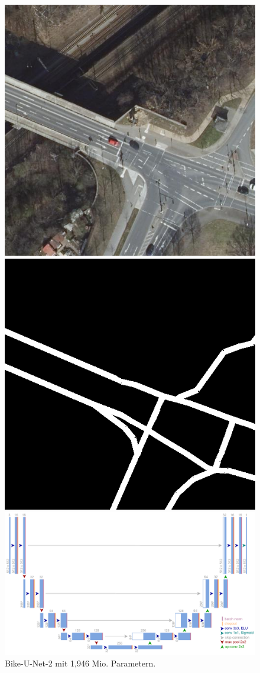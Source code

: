 \begin{figure}[h]
	\begin{minipage}{.49\textwidth}
		\flushleft
		\includegraphics[width=.25\textwidth]{Bilder/good-cut-ex.png} 
	\end{minipage}
	\hfill
	\begin{minipage}{.49\textwidth}
		\flushright
		\includegraphics[width=.25\textwidth]{Bilder/good-cut-ex-mask.png} 
		\hspace*{2mm}
	\end{minipage}
	\begin{minipage}{1.\textwidth}
		\centering
		\includegraphics[width=1.\textwidth]{Bilder/own-unet-2mil.pdf} 
	\end{minipage}
	\caption{Bike-U-Net-2 mit 1,946 Mio. Parametern.}
	\label{fig:bike-unet-2}
\end{figure} 

